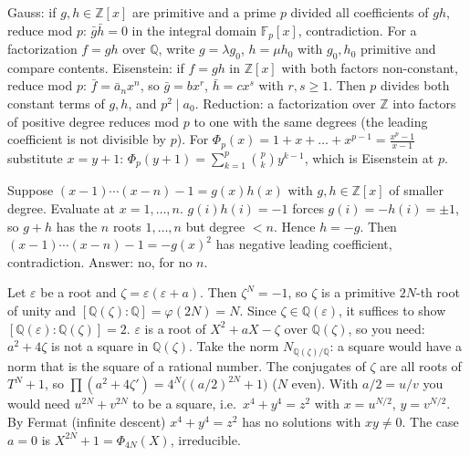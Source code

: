 \documentclass[11pt,a4paper]{article}
\begin{document}

 Gauss: if $g,h\in\mathbb{Z}[x]$ are primitive and a prime $p$ divided all coefficients of $gh$, reduce mod $p$: $\bar g\bar h=0$ in the integral domain $\mathbb{F}_p[x]$, contradiction. For a factorization $f=gh$ over $\mathbb{Q}$, write $g=\lambda g_0$, $h=\mu h_0$ with $g_0,h_0$ primitive and compare contents.
 Eisenstein: if $f=gh$ in $\mathbb{Z}[x]$ with both factors non-constant, reduce mod $p$: $\bar f=\bar a_nx^n$, so $\bar g=bx^r$, $\bar h=cx^s$ with $r,s\ge1$. Then $p$ divides both constant terms of $g,h$, and $p^2\mid a_0$. Reduction: a factorization over $\mathbb{Z}$ into factors of positive degree reduces mod $p$ to one with the same degrees (the leading coefficient is not divisible by $p$).
 For $\Phi_p(x)=1+x+\dots+x^{p-1}=\frac{x^p-1}{x-1}$ substitute $x=y+1$: $\Phi_p(y+1)=\sum_{k=1}^{p}\binom pky^{k-1}$, which is Eisenstein at $p$.

 Suppose $(x-1)\cdots(x-n)-1=g(x)h(x)$ with $g,h\in\mathbb{Z}[x]$ of smaller degree. Evaluate at $x=1,\dots,n$.
 $g(i)h(i)=-1$ forces $g(i)=-h(i)=\pm1$, so $g+h$ has the $n$ roots $1,\dots,n$ but degree $<n$. Hence $h=-g$.
 Then $(x-1)\cdots(x-n)-1=-g(x)^2$ has negative leading coefficient, contradiction. Answer: no, for no $n$.

 Let $\varepsilon$ be a root and $\zeta=\varepsilon(\varepsilon+a)$. Then $\zeta^N=-1$, so $\zeta$ is a primitive $2N$-th root of unity and $[\mathbb{Q}(\zeta):\mathbb{Q}]=\varphi(2N)=N$. Since $\zeta\in\mathbb{Q}(\varepsilon)$, it suffices to show $[\mathbb{Q}(\varepsilon):\mathbb{Q}(\zeta)]=2$.
 $\varepsilon$ is a root of $X^2+aX-\zeta$ over $\mathbb{Q}(\zeta)$, so you need: $a^2+4\zeta$ is not a square in $\mathbb{Q}(\zeta)$. Take the norm $N_{\mathbb{Q}(\zeta)/\mathbb{Q}}$: a square would have a norm that is the square of a rational number.
 The conjugates of $\zeta$ are all roots of $T^N+1$, so $\prod(a^2+4\zeta')=4^N\bigl((a/2)^{2N}+1\bigr)$ ($N$ even). With $a/2=u/v$ you would need $u^{2N}+v^{2N}$ to be a square, i.e.\ $x^4+y^4=z^2$ with $x=u^{N/2}$, $y=v^{N/2}$.
 By Fermat (infinite descent) $x^4+y^4=z^2$ has no solutions with $xy\ne0$. The case $a=0$ is $X^{2N}+1=\Phi_{4N}(X)$, irreducible.
\end{document}
